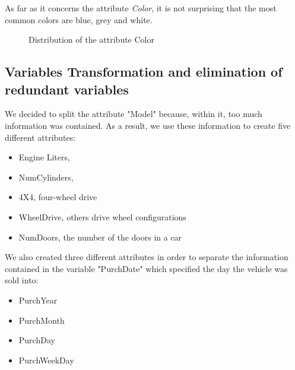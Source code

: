 \documentclass{article}
\begin{document}
As far as it concerns the attribute \emph{Color}, it is not surprising that the most common colors are blue, grey and white.
\begin{figure}[H]
    \centering
	\caption{{ Distribution of the attribute Color}}
\end{figure}


\subsection{Variables Transformation and elimination of redundant variables}

We decided to split the attribute "Model" because, within it, too much information was contained. As a result, we use these information to create five different attributes:

\begin{itemize}
\item Engine Liters, 
\item NumCylinders,
\item 4X4, four-wheel drive
\item WheelDrive, others drive wheel configurations 
\item NumDoors, the number of the doors in a car
\end{itemize}

We also created three different attributes in order to separate the information contained in the variable "PurchDate" which specified the day the vehicle was sold into:

\begin{itemize}
\item PurchYear
\item PurchMonth
\item PurchDay
\item PurchWeekDay
\end{itemize}
\end{document}
